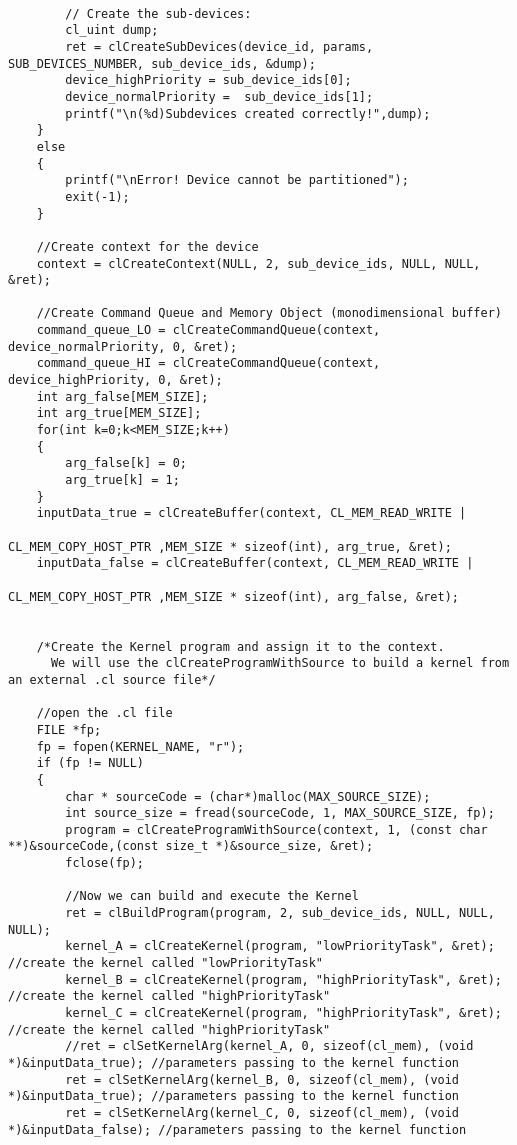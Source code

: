 {\begin{verbatim}
		
		// Create the sub-devices:
		cl_uint dump;
		ret = clCreateSubDevices(device_id, params, SUB_DEVICES_NUMBER, sub_device_ids, &dump);
		device_highPriority = sub_device_ids[0];
	    device_normalPriority =  sub_device_ids[1];
		printf("\n(%d)Subdevices created correctly!",dump);
	}
	else
	{
		printf("\nError! Device cannot be partitioned");
		exit(-1);
	}
	
	//Create context for the device
	context = clCreateContext(NULL, 2, sub_device_ids, NULL, NULL, &ret);

	//Create Command Queue and Memory Object (monodimensional buffer)
	command_queue_LO = clCreateCommandQueue(context, device_normalPriority, 0, &ret);
	command_queue_HI = clCreateCommandQueue(context, device_highPriority, 0, &ret);
	int arg_false[MEM_SIZE];
	int arg_true[MEM_SIZE];
	for(int k=0;k<MEM_SIZE;k++)
	{
		arg_false[k] = 0;
		arg_true[k] = 1;
	}
	inputData_true = clCreateBuffer(context, CL_MEM_READ_WRITE |
																	CL_MEM_COPY_HOST_PTR ,MEM_SIZE * sizeof(int), arg_true, &ret);
	inputData_false = clCreateBuffer(context, CL_MEM_READ_WRITE |
																	CL_MEM_COPY_HOST_PTR ,MEM_SIZE * sizeof(int), arg_false, &ret);


	/*Create the Kernel program and assign it to the context.
	  We will use the clCreateProgramWithSource to build a kernel from an external .cl source file*/

	//open the .cl file
	FILE *fp;
	fp = fopen(KERNEL_NAME, "r");
	if (fp != NULL)
	{
		char * sourceCode = (char*)malloc(MAX_SOURCE_SIZE);
		int source_size = fread(sourceCode, 1, MAX_SOURCE_SIZE, fp);
		program = clCreateProgramWithSource(context, 1, (const char **)&sourceCode,(const size_t *)&source_size, &ret);
		fclose(fp);

		//Now we can build and execute the Kernel
		ret = clBuildProgram(program, 2, sub_device_ids, NULL, NULL, NULL);
		kernel_A = clCreateKernel(program, "lowPriorityTask", &ret);  //create the kernel called "lowPriorityTask"
		kernel_B = clCreateKernel(program, "highPriorityTask", &ret); //create the kernel called "highPriorityTask"
		kernel_C = clCreateKernel(program, "highPriorityTask", &ret);	//create the kernel called "highPriorityTask"
		//ret = clSetKernelArg(kernel_A, 0, sizeof(cl_mem), (void *)&inputData_true); //parameters passing to the kernel function
		ret = clSetKernelArg(kernel_B, 0, sizeof(cl_mem), (void *)&inputData_true); //parameters passing to the kernel function
		ret = clSetKernelArg(kernel_C, 0, sizeof(cl_mem), (void *)&inputData_false); //parameters passing to the kernel function


\end{verbatim}}
